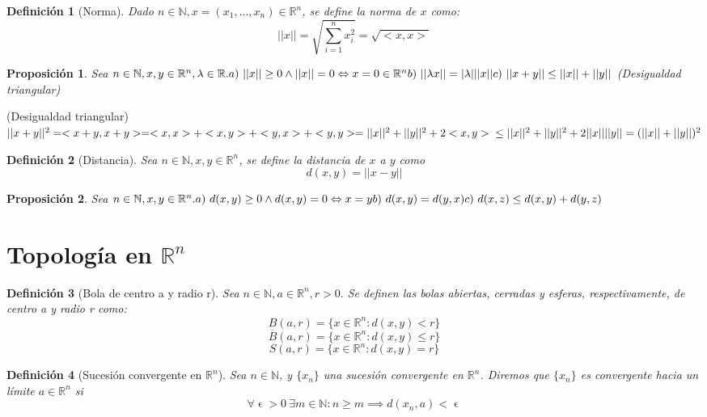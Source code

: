 \documentclass[11pt, a4paper]{article}
\makeatletter
\newif\IfInSansMode
\let\oldsf\sffamily
\renewcommand*{\sffamily}{\oldsf\mathversion{sans}\InSansModetrue}
\let\oldnorm\normalfont
\renewcommand*{\normalfont}{\oldnorm\InSansModefalse\mathversion{normal}}
\let\epsilon\upvarepsilon
\newcommand{\R}{\mathbb{R}} \newcommand{\N}{\mathbb{N}}
\renewenvironment{proof}[1][\proofname] {\par\pushQED{\qed}\normalfont\topsep6\p@\@plus6\p@\relax\trivlist\item[\hskip\labelsep\itshape\sffamily#1\@addpunct{.}]\ignorespaces}{\popQED\endtrivlist\@endpefalse}
\theoremstyle{theorem-style}
\newtheorem{nprop}{Proposición}[section]
\theoremstyle{definition-style}
\newtheorem{ndef}{Definición}[section]
\theoremstyle{remark-style}
\theoremstyle{example-style}
\makeatother
\begin{document}
\begin{ndef}[Norma]
Dado $n \in \N, x = (x_1,...,x_n) \in \R^n$, se define la norma de $x$ como: $$||x|| = \sqrt{\sum_{i=1}^{n}x_i^2} = \sqrt{<x,x>}$$
\end{ndef}

\begin{nprop}
Sea $n \in \N, x,y \in \R^n, \lambda \in \R. \\
a) \ ||x|| \ge 0 \land ||x|| = 0 \Leftrightarrow x = 0 \in \R^n \\
b) \ ||\lambda x|| = |\lambda| ||x|| \\
c) \ ||x+y|| \le ||x|| + ||y||$ (Desigualdad triangular)
\end{nprop}

\begin{proof}
(Desigualdad triangular) \\ $||x+y||^2 = <x+y,x+y> = <x,x> + <x,y> + <y,x> + <y,y> = ||x||^2 + ||y||^2 + 2<x,y> \\ \le ||x||^2 + ||y||^2 + 2||x|| ||y|| = (||x||+||y||)^2$
\end{proof}

\begin{ndef}[Distancia]
Sea $n \in \N, x,y \in \R^n$, se define la distancia de $x$ a $y$ como $$d(x,y)= ||x-y||$$
\end{ndef}

\begin{nprop}
Sea $n \in \N, x,y \in \R^n. \\
a) \ d(x,y) \ge 0 \land d(x,y)=0 \Leftrightarrow x=y \\
b) \ d(x,y)=d(y,x) \\
c) \ d(x,z) \le d(x,y)+d(y,z)$
\end{nprop}

\section{Topología en $\R^n$}

\begin{ndef}[Bola de centro a y radio r]
Sea $n \in \N, a \in \R^n, r > 0.$ Se definen las bolas abiertas, cerradas y esferas, respectivamente, de centro a y radio r como: $$B(a,r) = \{x \in \R^n: d(x,y) < r\} $$ $$\overline{B}(a,r) = \{x \in \R^n: d(x,y) \leq r\} $$ $$S(a,r) = \{x \in \R^n: d(x,y) = r\}$$
\end{ndef}

\begin{ndef}[Sucesión convergente en $\R^n$]
Sea $n \in \N$, y $\{x_n\}$ una sucesión convergente en $\R^n$. Diremos que $\{x_n\}$ es convergente hacia un límite $a \in \R^n$ si $$ \forall \epsilon > 0 \ \exists m \in \N: n \geq m \implies d(x_n,a) < \epsilon$$
\end{ndef}
\end{document}
